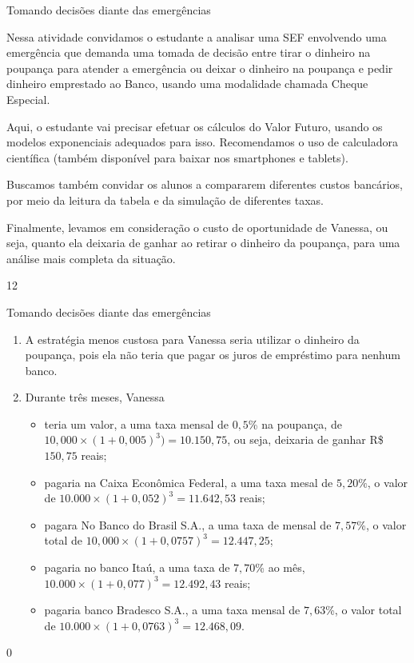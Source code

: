 \begin{sugestions}{Tomando decisões diante das emergências}
{
Nessa atividade convidamos o estudante a analisar uma SEF envolvendo uma emergência que demanda uma tomada de decisão entre tirar o dinheiro na poupança para atender a emergência ou deixar o dinheiro na poupança e pedir dinheiro emprestado ao Banco, usando uma modalidade chamada Cheque Especial.

Aqui, o estudante vai precisar efetuar os cálculos do Valor Futuro, usando os modelos exponenciais adequados para isso. Recomendamos o uso de calculadora científica (também disponível para baixar nos smartphones e tablets). 

Buscamos também convidar os alunos a compararem diferentes custos bancários, por meio da leitura da tabela e da simulação de diferentes taxas.

Finalmente, levamos em consideração o custo de oportunidade de Vanessa, ou seja, quanto ela deixaria de ganhar ao retirar o dinheiro da poupança, para uma análise mais completa da situação. 

}{1}{2}
\end{sugestions}
\begin{answer}{Tomando decisões diante das emergências}
{
  \begin{enumerate}
    \item A estratégia menos custosa para Vanessa seria utilizar o dinheiro da poupança, pois ela não teria que pagar os juros de empréstimo para nenhum banco.
    \item Durante três meses, Vanessa 

    \begin{itemize}
      \item teria um valor, a uma taxa mensal de $0{,}5$\% na poupança, de $10,000\times(1+0{,}005)^3) = 10.150{,}75$, ou seja, deixaria de ganhar R\$ $150{,}75$ reais;
      \item pagaria na Caixa Econômica Federal, a uma taxa mesal de $5{,}20\%$, o valor de $10.000\times(1+0{,}052)^3=11.642{,}53$ reais;
      \item pagara No Banco do Brasil S.A., a uma taxa de mensal de $7{,}57$\%, o valor total de $10{,}000\times(1+0{,}0757)^3=12.447{,}25$;
      \item pagaria no banco Itaú, a uma taxa de $7{,}70$\% ao mês, $10.000\times(1+0{,}077)^3=12.492{,}43$ reais;
      \item pagaria banco Bradesco S.A., a uma taxa mensal de $7{,}63$\%, o valor total de $10.000\times(1+0{,}0763)^3=12.468{,}09$.
    \end{itemize}
  \end{enumerate}
}{0}
\end{answer}

